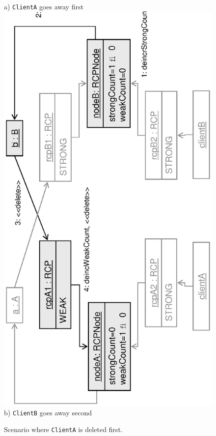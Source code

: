 \documentclass[pdf,ps2pdf,11pt]{SANDreport}
\begin{document}
{\begin{figure}
\begin{center}
\\[2ex] a) {}\texttt{ClientA} goes away first \\[3ex]
\includegraphics*[angle=270,scale=0.65]{CircularRCP_A_B_ClientA_2}
\\[2ex] b) {}\texttt{ClientB} goes away second \\[3ex]
\end{center}
\caption{
\label{fig:CircularRCP_A_B_ClientA}
Scenario where {}\texttt{ClientA} is deleted first.  }
\end{figure}
\esinglespace}
\end{document}
